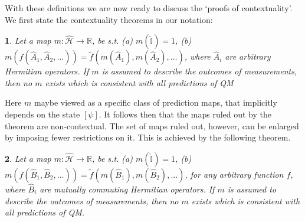 \documentclass[british,aps,prl,superscriptaddress,nofootinbib,times,reprint]{revtex4-1}
\theoremstyle{plain}
\newtheorem{thm}{\protect\theoremname}
\theoremstyle{definition}
\theoremstyle{remark}
\theoremstyle{plain}
\theoremstyle{plain}
\theoremstyle{plain}
\theoremstyle{definition}
\theoremstyle{definition}
\providecommand{\theoremname}{Theorem}
\begin{document}
With these definitions we are now ready to discuss
the `proofs of contextuality'. We first state the
contextuality theorems in our notation:
\begin{thm} 
Let a map
$m:\hat{\mathcal{H}}\to\mathbb{R}$, be s.t. (a)
$m(\hat{\mathbb{I}})=1$, (b)
$m(f(\hat{A}_{1},\hat{A}_{2},\dots))=\tilde
f(m(\hat{A}_{1}),m(\hat{A}_{2}),\dots)$, where
$\hat{A}_{i}$ are arbitrary Hermitian operators.
If $m$ is assumed to describe the outcomes of
measurements, then no $m$ exists which is
consistent with all predictions of
QM\label{thm:det}
\end{thm} 
Here $m$ maybe viewed as a specific
class of prediction maps, that implicitly depends
on the state $[\psi]$. It follows then that the
maps ruled out by the theorem are non-contextual.
The set of maps ruled out, however, can be
enlarged by imposing fewer restrictions on it.
This is achieved by the following theorem.
\begin{thm} Let a map
$m:\hat{\mathcal{H}}\to\mathbb{R}$, be s.t. (a)
$m(\hat{\mathbb{I}})=1$, (b)
$m(f(\hat{B}_{1},\hat{B}_{2},\dots))=\tilde
f(m(\hat{B}_{1}),m(\hat{B}_{2}),\dots)$, for any
arbitrary function $f$, where $\hat{B}_{i}$ are
mutually commuting Hermitian operators. If $m$ is
assumed to describe the outcomes of measurements,
then no $m$ exists which is consistent with all
predictions of QM. 
\label{thm:KS}
\end{thm}
\end{document}

